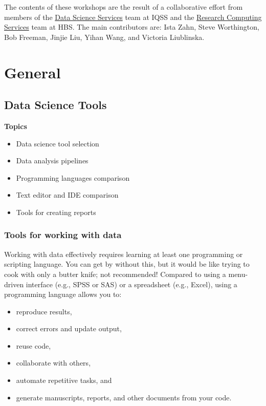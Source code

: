 \documentclass[]{book}
\providecommand{\tightlist}{%
  \setlength{\itemsep}{0pt}\setlength{\parskip}{0pt}}
\begin{document}
The contents of these workshops are the result of a collaborative effort from members of the \href{http://dss.iq.harvard.edu}{Data Science Services} team at IQSS and the \href{https://training.rcs.hbs.org}{Research Computing Services} team at HBS. The main contributors are: Ista Zahn, Steve Worthington, Bob Freeman, Jinjie Liu, Yihan Wang, and Victoria Liublinska.

\hypertarget{part-general}{%
\part{General}\label{part-general}}

\hypertarget{data-science-tools}{%
\chapter{Data Science Tools}\label{data-science-tools}}

\textbf{Topics}

\begin{itemize}
\tightlist
\item
  Data science tool selection
\item
  Data analysis pipelines
\item
  Programming languages comparison
\item
  Text editor and IDE comparison
\item
  Tools for creating reports
\end{itemize}

\hypertarget{tools-for-working-with-data}{%
\section{Tools for working with data}\label{tools-for-working-with-data}}

Working with data effectively requires learning at least one programming or scripting language. You can get by without this, but it would be like trying to cook with only a butter knife; not recommended! Compared to using a menu-driven interface (e.g., SPSS or SAS) or a spreadsheet (e.g., Excel), using a programming language allows you to:

\begin{itemize}
\tightlist
\item
  reproduce results,
\item
  correct errors and update output,
\item
  reuse code,
\item
  collaborate with others,
\item
  automate repetitive tasks, and
\item
  generate manuscripts, reports, and other documents from your code.
\end{itemize}
\end{document}
